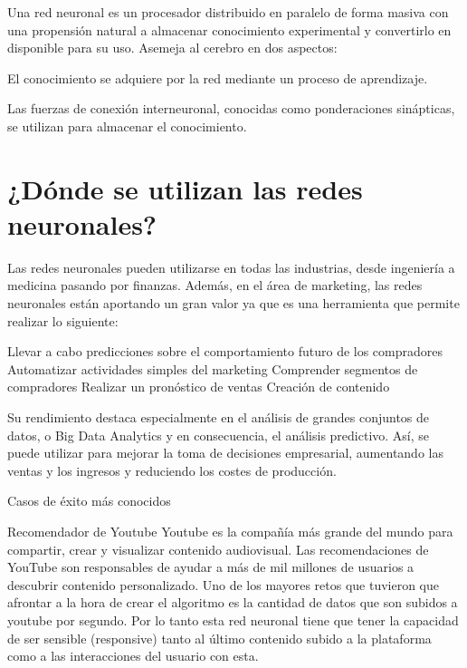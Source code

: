 \documentclass[letterpaper,12pt]{article}
\begin{document}
    Una red neuronal es un procesador distribuido en paralelo de forma masiva con una propensión natural a almacenar conocimiento experimental y convertirlo en disponible para su uso. Asemeja al cerebro en dos aspectos:

    El conocimiento se adquiere por la red mediante un proceso de aprendizaje.
    
    Las fuerzas de conexión interneuronal, conocidas como ponderaciones sinápticas, se utilizan para almacenar el conocimiento.
\newpage
\section{¿Dónde se utilizan las redes neuronales?}
Las redes neuronales pueden utilizarse en todas las industrias, desde ingeniería a medicina pasando por finanzas. Además, en el área de marketing, las redes neuronales están aportando un gran valor ya que es una herramienta que permite realizar lo siguiente:\newline

Llevar a cabo predicciones sobre el comportamiento futuro de los compradores\newline
Automatizar actividades simples del marketing\newline
Comprender segmentos de compradores\newline
Realizar un pronóstico de ventas\newline
Creación de contenido\newline
 
Su rendimiento destaca especialmente en el análisis de grandes conjuntos de datos, o Big Data Analytics y en consecuencia, el análisis predictivo.
Así, se puede utilizar para mejorar la toma de decisiones empresarial, aumentando las ventas y los ingresos y reduciendo los costes de producción.\newline

Casos de éxito más conocidos \newline

Recomendador de Youtube \newline
Youtube es la compañía más grande del mundo para compartir, crear y visualizar contenido audiovisual. Las recomendaciones de YouTube son responsables de ayudar a más de mil millones de usuarios a descubrir contenido personalizado. Uno de los mayores retos que tuvieron que afrontar a la hora de crear el algoritmo es la cantidad de datos que son subidos a youtube por segundo. Por lo tanto esta red neuronal tiene que tener la capacidad de ser sensible (responsive) tanto al último contenido subido a la plataforma como a las interacciones del usuario con esta.
\end{document}
